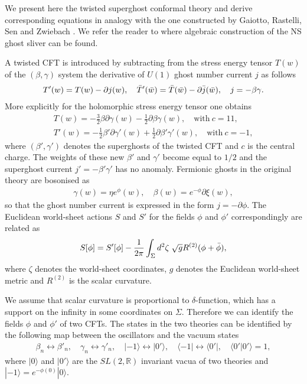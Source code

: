 \documentclass[a4paper,12pt]{article}
\newcommand{\pd}{\partial}
\begin{document}
We present here the twisted superghost conformal theory
and derive corresponding equations in analogy with the one
constructed by Gaiotto, Rastelli, Sen and
Zwiebach \cite{0111129}. We refer the reader to \cite{ia_nsgs} where algebraic construction
of the NS ghost sliver can be found.

A twisted CFT is introduced by subtracting from the stress energy tensor $T(w)$
of the $(\beta,\gamma)$ system the derivative of $U(1)$ ghost number current
$j$ as follows
\begin{gather}
T'(w)=T(w)-\pd j(w),\quad \Bar{T}'(\Bar{w})=\Bar{T}(\Bar{w})-\pd\Bar{j}(\Bar{w}),\quad j=-\beta\gamma.
\end{gather}
More explicitly for the holomorphic stress energy tensor one obtains
\begin{eqnarray}
T(w)=-\frac32\beta\pd\gamma(w)-\frac12\pd\beta\gamma(w),\quad \mathrm{with~}c=11,\\
T'(w)=-\frac12\beta'\pd\gamma'(w)+\frac12\pd\beta'\gamma'(w),\quad
\mathrm{with~}c=-1,
\end{eqnarray}
where $(\beta',\gamma')$ denotes the superghosts of the twisted CFT and $c$ is the central charge.
The weights of these new $\beta'$ and $\gamma'$ become equal
to $1/2$
and the superghost current $j'=-\beta'\gamma'$ has no anomaly.
Fermionic ghosts in the original theory are bosonised as
\begin{gather}
\gamma(w)=\eta e^{\phi}(w),\quad
\beta(w)= e^{-\phi}\pd\xi(w),
\end{gather}
so that the ghost number current is expressed in the form $j=-\pd\phi$.
The Euclidean world-sheet actions
$S$ and $S'$ for the fields $\phi$ and $\phi'$ correspondingly are related as
\begin{gather}
S[\phi]= S'[\phi]-\frac{1}{2\pi}\int_{\Sigma}
d^{2}\zeta\;\sqrt{g}R^{(2)}(\phi+\Bar{\phi}),
\end{gather}
where $\zeta$ denotes the world-sheet coordinates, $g$ denotes the
Euclidean world-sheet metric and $R^{(2)}$ is the scalar
curvature.

We assume that scalar curvature is proportional to $\delta$-function,
which has a support on the infinity in some coordinates on $\Sigma$.
Therefore we can identify the fields $\phi$ and $\phi'$ of two CFTs.
The states in the two theories can be identified by
the following map between the oscillators and the vacuum states
\begin{gather}
\beta_{n}\leftrightarrow\beta'{}_{n},\quad \gamma_{n}\leftrightarrow\gamma'{}_{n},\quad
|-1\rangle\leftrightarrow|0'\rangle,\quad \langle
-1|\leftrightarrow\langle 0'|,\quad
\langle0'|0'\rangle=1,\label{cooresp}
\end{gather}
where $|0\rangle$ and $|0'\rangle$ are the $SL(2,\mathbb{R})$
invariant vacua  of two  theories and $|-1\rangle=e^{-\phi(0)}|0\rangle$.
\end{document}
